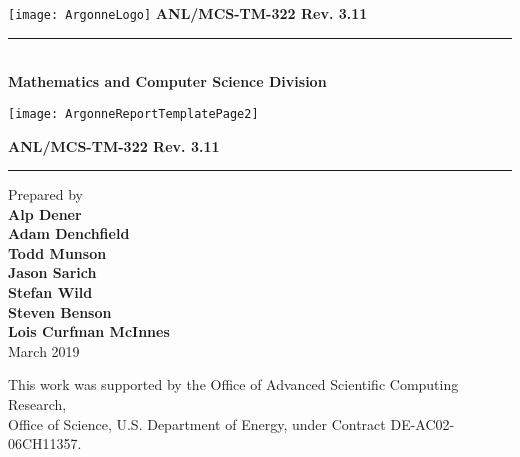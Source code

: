 
\pagestyle{empty}
\hspace{-.65in}\texttt{[image: ArgonneLogo]}
\hfill  {\large {\bf ANL/MCS-TM-322 Rev. 3.11}}

\vspace*{2in}
\vspace*{8pt}
\hrule
\vspace*{8pt}

\vspace*{1in}
\noindent \\
{\Large {\bf Mathematics and Computer Science Division}}

\vspace*{10pt}


\vspace*{20pt}


\newpage
{}
\centerline{\texttt{[image: ArgonneReportTemplatePage2]}}
\newpage
\restoregeometry


\pagestyle{empty}
\hfill {\large {\bf ANL/MCS-TM-322 Rev. 3.11}}

\vspace*{2in}
\vspace*{8pt}
\hrule
\vspace*{8pt}

\vspace*{0.5in}
\noindent Prepared by \\
{\bf Alp Dener \\ Adam Denchfield \\ Todd Munson \\ Jason Sarich \\ Stefan Wild \\ Steven Benson \\ Lois Curfman McInnes}\\

\vspace*{30pt}
\noindent March 2019

\vspace*{20pt}
\noindent This work was supported by the Office of Advanced Scientific Computing Research, \\
Office of Science, U.S. Department of Energy, under Contract DE-AC02-06CH11357.
